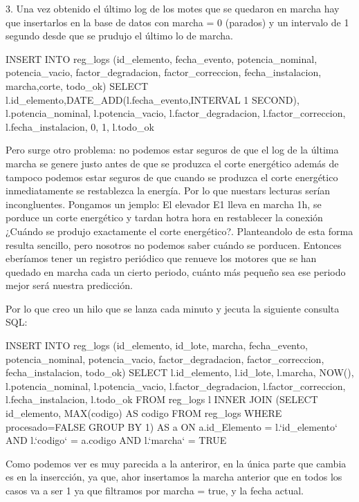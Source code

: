 3. Una vez obtenido el último log de los motes que se quedaron en marcha hay que insertarlos en la base de datos 
con marcha = 0 (parados) y un intervalo de 1 segundo desde que se prudujo el último lo de marcha.

INSERT INTO reg_logs (id_elemento, fecha_evento, potencia_nominal, potencia_vacio, factor_degradacion, factor_correccion, fecha_instalacion, marcha,corte, todo_ok) 
        SELECT l.id_elemento,DATE_ADD(l.fecha_evento,INTERVAL 1 SECOND), l.potencia_nominal, l.potencia_vacio, l.factor_degradacion,
        l.factor_correccion, l.fecha_instalacion, 0, 1, l.todo_ok  


Pero surge otro problema: no podemos estar seguros de que el log de la última marcha se genere
justo antes de que se produzca el corte energético además de tampoco podemos estar seguros de que
cuando se produzca el corte energético inmediatamente se restablezca la energía. Por lo que nuestars lecturas
serían incongluentes. Pongamos un jemplo: El elevador E1 lleva en marcha 1h, se porduce un corte energético
y tardan hotra hora en restablecer la conexión ¿Cuándo se produjo exactamente el corte energético?. Planteandolo
de esta forma resulta sencillo, pero nosotros no podemos saber cuándo se porducen. Entonces eberíamos tener
un registro periódico que renueve los motores que se han quedado en marcha cada un cierto periodo, cuánto
más pequeño sea ese periodo mejor será nuestra predicción.

Por lo que creo un hilo que se lanza cada minuto y jecuta la siguiente consulta SQL: 


INSERT INTO reg_logs (id_elemento, id_lote, marcha, fecha_evento, potencia_nominal, potencia_vacio, factor_degradacion, factor_correccion, fecha_instalacion, todo_ok)
SELECT l.id_elemento, l.id_lote, l.marcha, NOW(), l.potencia_nominal, l.potencia_vacio, l.factor_degradacion,
        l.factor_correccion, l.fecha_instalacion,  l.todo_ok 
        FROM reg_logs l INNER JOIN 
       		 (SELECT id_elemento, MAX(codigo) AS codigo FROM reg_logs WHERE procesado=FALSE GROUP BY 1) AS a 
       		 ON a.id_Elemento = l.`id_elemento` AND l.`codigo` = a.codigo AND l.`marcha` = TRUE

Como podemos ver es muy parecida a la anteriror, en la única parte que cambia es en la insercción,
ya que, ahor insertamos la marcha anterior que en todos los casos va a ser 1 ya que filtramos por marcha = true,
 y la fecha actual.




